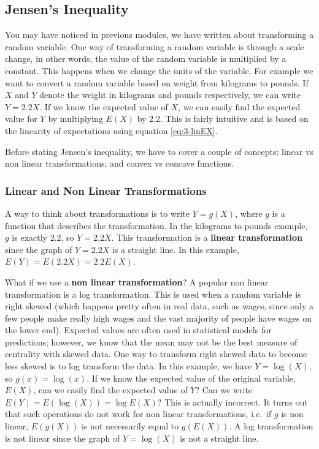 \documentclass[
]{book}
\begin{document}
\subsection{Jensen's Inequality}\label{jensens-inequality}

You may have noticed in previous modules, we have written about transforming a random variable. One way of transforming a random variable is through a scale change, in other words, the value of the random variable is multiplied by a constant. This happens when we change the units of the variable. For example we want to convert a random variable based on weight from kilograms to pounds. If \(X\) and \(Y\) denote the weight in kilograms and pounds respectively, we can write \(Y = 2.2X\). If we know the expected value of \(X\), we can easily find the expected value for \(Y\) by multiplying \(E(X)\) by 2.2. This is fairly intuitive and is based on the linearity of expectations using equation \eqref{eq:3-linEX}.

Before stating Jensen's inequality, we have to cover a couple of concepts: linear vs non linear transformations, and convex vs concave functions.

\subsubsection{Linear and Non Linear Transformations}\label{linnonlin}

A way to think about transformations is to write \(Y = g(X)\), where \(g\) is a function that describes the transformation. In the kilograms to pounds example, \(g\) is exactly 2.2, so \(Y = 2.2X\). This transformation is a \textbf{linear transformation} since the graph of \(Y = 2.2X\) is a straight line. In this example, \(E(Y) = E(2.2X) = 2.2E(X)\).

What if we use a \textbf{non linear transformation}? A popular non linear transformation is a log transformation. This is used when a random variable is right skewed (which happens pretty often in real data, such as wages, since only a few people make really high wages and the vast majority of people have wages on the lower end). Expected values are often used in statistical models for predictions; however, we know that the mean may not be the best measure of centrality with skewed data. One way to transform right skewed data to become less skewed is to log transform the data. In this example, we have \(Y = \log(X)\), so \(g(x) = \log(x)\). If we know the expected value of the original variable, \(E(X)\), can we easily find the expected value of \(Y\)? Can we write \(E(Y) = E(\log(X)) = \log E(X)\)? This is actually incorrect. It turns out that such operations do not work for non linear transformations, i.e.~if \(g\) is non linear, \(E(g(X))\) is not necessarily equal to \(g(E(X))\). A log transformation is not linear since the graph of \(Y = \log(X)\) is not a straight line.
\end{document}
